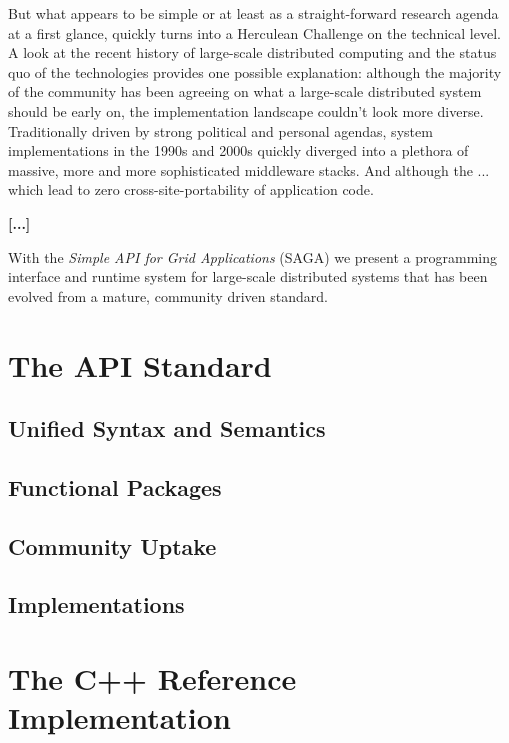 \documentclass[a4paper,10pt]{article}
\begin{document}
 But what appears to be simple or at least as a straight-forward research agenda at a first glance, 
 quickly turns into a Herculean Challenge on the technical level. A look at the recent history of 
 large-scale distributed computing and the status quo of the technologies provides one possible
 explanation: although
 the majority of the community has been agreeing on what a large-scale distributed system should
 be early on, the implementation landscape couldn't look more diverse. Traditionally 
 driven by strong political and personal agendas, system implementations in the 1990s and 2000s 
 quickly diverged into a plethora of massive, more and more sophisticated middleware stacks.
 And although the ... which lead to zero cross-site-portability of application code.
 
 
{\bf [...] }
 
 
 
 With the \textit{Simple API for Grid Applications} (SAGA) we present a programming interface and
 runtime system for large-scale distributed systems that has been evolved from a mature, community 
 driven standard. 
 
 
 
 \section{The API Standard}

 \subsection{Unified Syntax and Semantics}
 
 \subsection{Functional Packages}

 \subsection{Community Uptake}
 
 \subsection{Implementations}

 \section{The C++ Reference Implementation}
 
\end{document}
